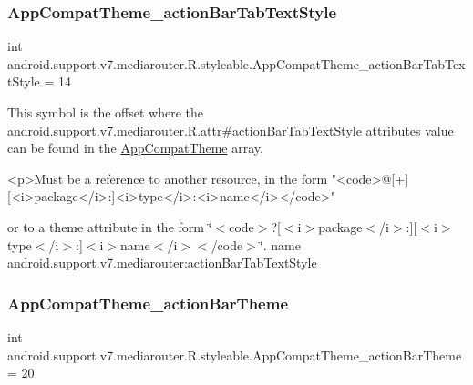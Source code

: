 \subsubsection{\texorpdfstring{App\+Compat\+Theme\+\_\+action\+Bar\+Tab\+Text\+Style}{AppCompatTheme\_actionBarTabTextStyle}}
{\footnotesize\ttfamily int android.\+support.\+v7.\+mediarouter.\+R.\+styleable.\+App\+Compat\+Theme\+\_\+action\+Bar\+Tab\+Text\+Style = 14\hspace{0.3cm}{\ttfamily [static]}}

This symbol is the offset where the \hyperlink{classandroid_1_1support_1_1v7_1_1mediarouter_1_1R_1_1attr_a64b19641eebaac41f94630edbf34194b}{android.\+support.\+v7.\+mediarouter.\+R.\+attr\#action\+Bar\+Tab\+Text\+Style} attribute\textquotesingle{}s value can be found in the \hyperlink{classandroid_1_1support_1_1v7_1_1mediarouter_1_1R_1_1styleable_a4e3d3900c75d49aeb2f283cac00214d6}{App\+Compat\+Theme} array.

\begin{DoxyVerb}      <p>Must be a reference to another resource, in the form "<code>@[+][<i>package</i>:]<i>type</i>:<i>name</i></code>"
\end{DoxyVerb}
 or to a theme attribute in the form \char`\"{}$<$code$>$?\mbox{[}$<$i$>$package$<$/i$>$\+:\mbox{]}\mbox{[}$<$i$>$type$<$/i$>$\+:\mbox{]}$<$i$>$name$<$/i$>$$<$/code$>$\char`\"{}.  name android.\+support.\+v7.\+mediarouter\+:action\+Bar\+Tab\+Text\+Style \mbox{\label{classandroid_1_1support_1_1v7_1_1mediarouter_1_1R_1_1styleable_a4e99b208f1389299006016c4c0a05bfc}} 
\subsubsection{\texorpdfstring{App\+Compat\+Theme\+\_\+action\+Bar\+Theme}{AppCompatTheme\_actionBarTheme}}
{\footnotesize\ttfamily int android.\+support.\+v7.\+mediarouter.\+R.\+styleable.\+App\+Compat\+Theme\+\_\+action\+Bar\+Theme = 20\hspace{0.3cm}{\ttfamily [static]}}

